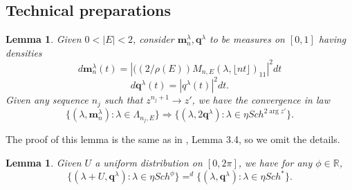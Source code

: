 \documentclass[12pt, reqno]{amsart}
\newtheorem{lemma}[theorem]{Lemma}
\theoremstyle{definition}
\theoremstyle{remark}
\numberwithin{equation}{section}
\begin{document}
\subsection{Technical preparations}
\begin{lemma}\label{lema5.1}
Given $0<|E|<2$, consider $\boldsymbol{m}_n^\lambda,\boldsymbol{q}^\lambda$ to be measures on $[0,1]$ having densities
$$d\boldsymbol{m}_n^\lambda(t)=|((2/\rho(E))M_{n,E}(\lambda,\lfloor nt\rfloor)_{11}|^2dt
$$
$$d\boldsymbol{q}^\lambda(t)=|q^\lambda(t)|^2dt.
$$
Given any sequence $n_j$ such that $z^{n_j+1}\to z'$, we have the convergence in law
$$
\{(\lambda,\boldsymbol{m}_n^\lambda):\lambda\in \Lambda_{n_j,E}\}\Rightarrow \{(\lambda,2\boldsymbol{q}^\lambda):\lambda\in \eta Sch^{2\arg z'}\}.
$$
\end{lemma}

 The proof of this lemma is the same as in \cite{rifkind2018eigenvectors}, Lemma 3.4, so we omit the details.




\begin{lemma}\label{lemma3.6!}
    Given $U$ a uniform distribution on $[0,2\pi]$, we have for any $\phi\in\mathbb{R}$,
$$
\{(\lambda+U,\boldsymbol{q}^\lambda):\lambda\in\eta Sch^\phi\}=^d \{(\lambda,\boldsymbol{q}^\lambda):\lambda\in \eta Sch^*\}.$$
\end{lemma}
\end{document}
